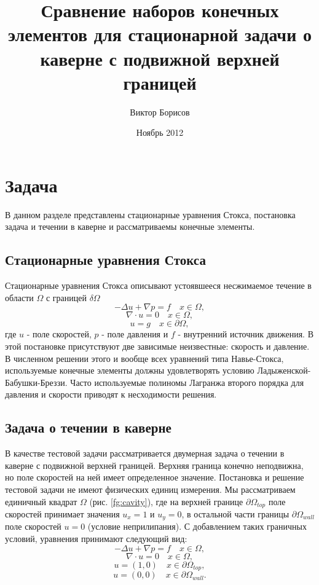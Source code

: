 \documentclass[12pt]{article}
\title{Сравнение наборов конечных элементов для стационарной задачи о каверне с подвижной верхней границей}
\date{Ноябрь 2012}
\author{Виктор Борисов}
\begin{document}
\maketitle

\section{Задача}
В данном разделе представлены стационарные уравнения Стокса, 
постановка задача и течении в каверне и рассматриваемы конечные элементы.
\subsection{Стационарные уравнения Стокса}
Стационарные уравнения Стокса описывают устоявшееся несжимаемое течение в области $\Omega$ с границей $\delta\Omega$
\begin{equation}
-\Delta u + \nabla p = f \quad x \in \Omega,
\end{equation}
\begin{equation}
\nabla\cdot u = 0 \quad x \in \Omega,
\end{equation}
\begin{equation}
u = g \quad x \in \partial\Omega,
\end{equation}
где $u$ - поле скоростей, $p$ - поле давления и $f$ - внутренний источник движения.
В этой постановке присутствуют две зависимые неизвестные: скорость и давление.
В численном решении этого и вообще всех уравнений типа Навье-Стокса, используемые конечные элементы должны удовлетворять условию Ладыженской-Бабушки-Бреззи. Часто используемые полиномы Лагранжа второго порядка для давления и скорости приводят к несходимости решения.

\subsection{Задача о течении в каверне}
В качестве тестовой задачи рассматривается двумерная задача о течении в каверне с подвижной верхней границей. Верхняя граница конечно неподвижна, но поле скоростей на ней имеет определенное значение. Постановка и решение тестовой задачи не имеют физических единиц измерения. Мы рассматриваем единичный квадрат $\Omega$ (рис. \ref{fg:cavity}), где на верхней границе $\partial\Omega_{top}$ поле скоростей принимает значения $u_x=1$ и $u_y=0$, в остальной части границы $\partial\Omega_{wall}$ поле скоростей $u=0$ (условие неприлипания).
С добавлением таких граничных условий, уравнения принимают следующий вид:
\begin{equation}
-\Delta u + \nabla p = f \quad x \in \Omega,
\end{equation}
\begin{equation}
\nabla\cdot u = 0 \quad x \in \Omega,
\end{equation}
\begin{equation}
u = (1, 0) \quad x \in \partial\Omega_{top},
\end{equation}
\begin{equation}
u = (0, 0) \quad x \in \partial\Omega_{wall}.
\end{equation}
\end{document}
